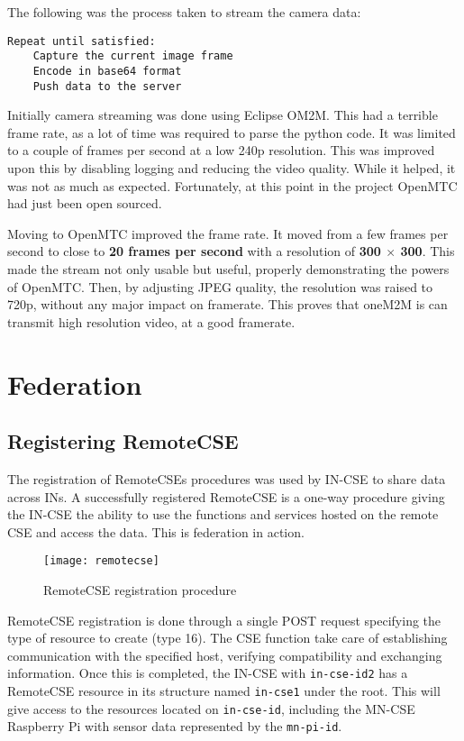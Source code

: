 The following was the process taken to stream the camera data:\\

\begin{lstlisting}[caption={Camera streaming pseudo code}, label={lst:camera-streaming-pseudo-code}]
Repeat until satisfied:
	Capture the current image frame
	Encode in base64 format
	Push data to the server
\end{lstlisting}

Initially camera streaming was done using Eclipse OM2M. This had a terrible frame rate, as a lot of time was required to parse the python code. It was limited to a couple of frames per second at a low 240p resolution. This was improved upon this by disabling logging and reducing the video quality. While it helped, it was not as much as expected. Fortunately, at this point in the project OpenMTC had just been open sourced.

Moving to OpenMTC improved the frame rate. It moved from a few frames per second to close to \textbf{20 frames per second} with a resolution of \textbf{300 $\times$ 300}. This made the stream not only usable but useful, properly demonstrating the powers of OpenMTC. Then, by adjusting JPEG quality, the resolution was raised to 720p, without any major impact on framerate. This proves that oneM2M is can transmit high resolution video, at a good framerate.

\section{Federation}

\subsection{Registering RemoteCSE}
\label{sec:remotecse}

The registration of RemoteCSEs procedures was used by IN-CSE to share data across INs. A successfully registered RemoteCSE is a one-way procedure giving the IN-CSE the ability to use the functions and services hosted on the remote CSE and access the data. This is federation in action.

\begin{figure}[H]
  \centering
  \texttt{[image: remotecse]}
  \caption[RemoteCSE Registration Procedure]{RemoteCSE registration procedure}
  \label{remotecse}
\end{figure}
  
RemoteCSE registration is done through a single POST request specifying the type of resource to create (type 16). The CSE function take care of establishing communication with the specified host, verifying compatibility and exchanging information. Once this is completed, the IN-CSE with \lstinline{in-cse-id2} has a RemoteCSE resource in its structure named \lstinline{in-cse1} under the root. This will give access to the resources located on \lstinline{in-cse-id}, including the MN-CSE Raspberry Pi with sensor data represented by the \lstinline{mn-pi-id}. 

